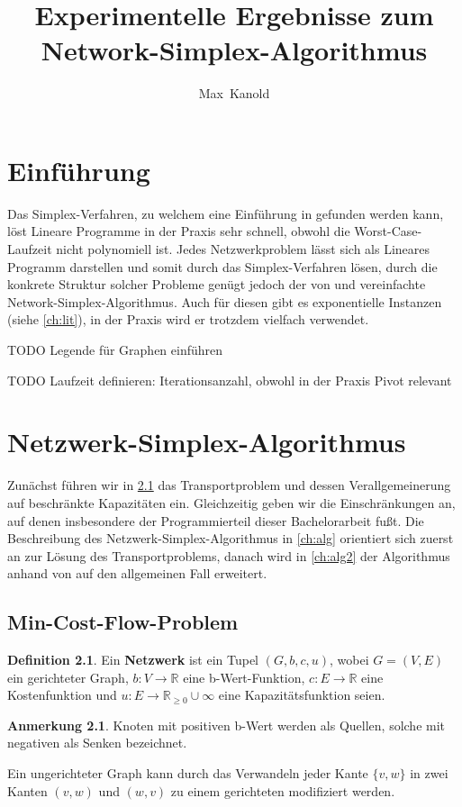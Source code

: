 \documentclass[a4paper,twoside,ngerman]{report}
\author{Max~Kanold}
\title{Experimentelle Ergebnisse zum Network-Simplex-Algorithmus}
\theoremstyle{plain}
\theoremstyle{definition}
\newtheorem{defn}[thm]{Definition}
\newtheorem*{anm}{Anmerkung}
\begin{document}
\maketitle
\tableofcontents

\newpage
\chapter{Einführung}
Das Simplex-Verfahren, zu welchem eine Einführung in \cite{NSAbook} gefunden werden kann, löst Lineare Programme in der Praxis sehr schnell, obwohl die Worst-Case-Laufzeit nicht polynomiell ist. Jedes Netzwerkproblem lässt sich als Lineares Programm darstellen und somit durch das Simplex-Verfahren lösen, durch die konkrete Struktur solcher Probleme genügt jedoch der von \cite[Dantzig, 1951]{erf1} und \cite[Orden, 1956]{erf2} vereinfachte Network-Simplex-Algorithmus. Auch für diesen gibt es exponentielle Instanzen (siehe \cref{ch:lit}), in der Praxis wird er trotzdem vielfach verwendet.

TODO Legende für Graphen einführen

TODO Laufzeit definieren: Iterationsanzahl, obwohl in der Praxis Pivot relevant

\newpage
\chapter{Netzwerk-Simplex-Algorithmus}
Zunächst führen wir in \cref{ch:MCF} das Transportproblem und dessen Verallgemeinerung auf beschränkte Kapazitäten ein. Gleichzeitig geben wir die Einschränkungen an, auf denen insbesondere der Programmierteil dieser Bachelorarbeit fußt. Die Beschreibung des Netzwerk-Simplex-Algorithmus in \cref{ch:alg} orientiert sich zuerst an \cite[S. 291\,ff.]{NSAbook} zur Lösung des Transportproblems, danach wird in \cref{ch:alg2} der Algorithmus anhand von \cite[S. 353\,ff.]{NSAbook} auf den allgemeinen Fall erweitert.

\section{Min-Cost-Flow-Problem}\label{ch:MCF}
\begin{defn}Ein \textbf{Netzwerk} ist ein Tupel $(G,b,c,u)$, wobei $G = (V,E)$ ein gerichteter Graph, $b : V\rightarrow\mathbb{R}$ eine b-Wert-Funktion, $c : E\rightarrow\mathbb{R}$ eine Kostenfunktion und $u : E\rightarrow\mathbb{R}_{\geq 0}\cup \infty$ eine Kapazitätsfunktion seien.\end{defn}
\begin{anm}Knoten mit positiven b-Wert werden als Quellen, solche mit negativen als Senken bezeichnet.

Ein ungerichteter Graph kann durch das Verwandeln jeder Kante $\{v,w\}$ in zwei Kanten $(v,w)$ und $(w,v)$ zu einem gerichteten modifiziert werden.\end{anm}
\end{document}

